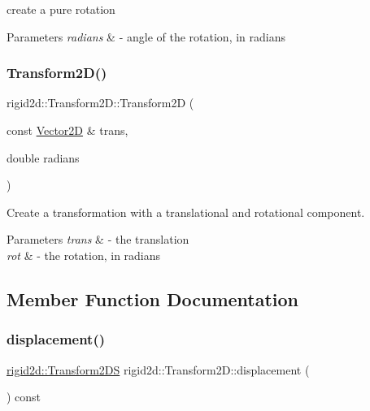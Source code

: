 create a pure rotation 


\begin{DoxyParams}{Parameters}
{\em radians} & -\/ angle of the rotation, in radians \\
\hline
\end{DoxyParams}
\mbox{\label{classrigid2d_1_1Transform2D_a47de6c24f25c57da553a0fdaf13e2138}} 
\subsubsection{\texorpdfstring{Transform2\+D()}{Transform2D()}\hspace{0.1cm}{\footnotesize\ttfamily [3/3]}}
{\footnotesize\ttfamily rigid2d\+::\+Transform2\+D\+::\+Transform2D (\begin{DoxyParamCaption}\item[{const \hyperlink{structrigid2d_1_1Vector2D}{Vector2D} \&}]{trans,  }\item[{double}]{radians }\end{DoxyParamCaption})}



Create a transformation with a translational and rotational component. 


\begin{DoxyParams}{Parameters}
{\em trans} & -\/ the translation \\
\hline
{\em rot} & -\/ the rotation, in radians \\
\hline
\end{DoxyParams}


\subsection{Member Function Documentation}
\mbox{\label{classrigid2d_1_1Transform2D_a2566972da0bb1c13f54b7ba948efd4f7}} 
\subsubsection{\texorpdfstring{displacement()}{displacement()}}
{\footnotesize\ttfamily \hyperlink{structrigid2d_1_1Transform2DS}{rigid2d\+::\+Transform2\+DS} rigid2d\+::\+Transform2\+D\+::displacement (\begin{DoxyParamCaption}{ }\end{DoxyParamCaption}) const}



